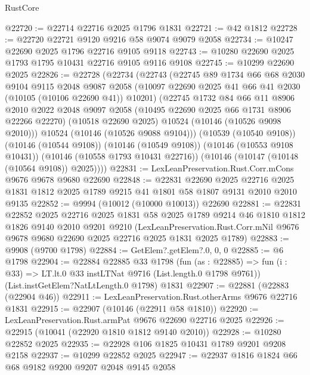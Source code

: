 \begin{lexlean}{RustCore}
\begin{coremodule}
@22720 := @22714 @22716 @2025 @1796 @1831
@22721 := @42 @1812
@22728 := @22720 @22721 @9120 @9216 @58 @9074 @9079 @2058
@22734 := @10247 @22690 @2025 @1796 @22716 @9105 @9118
@22743 := @10280 @22690 @2025 @1793 @1795 @10431 @22716 @9105 @9116 @9108
@22745 := @10299 @22690 @2025
@22826 := @22728
    (@22734
      (@22743
        (@22745
          @89
          @1734
          @66
          @68
          @2030
          @9104
          @9115
          @2048
          @9087
          @2058
          (@10097 @22690 @2025 @41 @66 @41 @2030 (@10105 (@10106 @22690 @41)) @10201)
          (@22745
            @1732
            @84
            @66
            @11
            @8906
            @2010
            @2022
            @2048
            @9097
            @2058
            (@10495 @22690 @2025 @66 @1731 @8906 @22266 @22270)
            (@10518 @22690 @2025)
            @10524
            (@10146 (@10526 @9098 @2010)))
          @10524
          (@10146 (@10526 @9088 @9104)))
        (@10539 (@10540 @9108))
        (@10146 (@10544 @9108))
        (@10146 (@10549 @9108))
        (@10146 (@10553 @9108 @10431))
        (@10146 (@10558 @1793 @10431 @22716))
        (@10146 (@10147 (@10148 (@10564 @9108)) @2025))))
@22831 := LexLeanPreservation.Rust.Corr.mCons @9676 @9678 @9680 @22690
@22848 := @22831
    @22690
    @2025
    @22716
    @2025
    @1831
    @1812
    @2025
    @1789
    @9215
    @41
    @1801
    @58
    @1807
    @9131
    @2010
    @2010
    @9135
@22852 := @9994 (@10012 (@10000 @10013)) @22690
@22881 := @22831
    @22852
    @2025
    @22716
    @2025
    @1831
    @58
    @2025
    @1789
    @9214
    @46
    @1810
    @1812
    @1826
    @9140
    @2010
    @9201
    @9210
    (LexLeanPreservation.Rust.Corr.mNil
      @9676
      @9678
      @9680
      @22690
      @2025
      @22716
      @2025
      @1831
      @2025
      @1789)
@22883 := @9908 (@9700 @1798)
@22884 := GetElem?.getElem?.{0, 0, 0}
@22885 := @6 @1798
@22904 := @22884
    @22885
    @33
    @1798
    (fun (as : @22885) =>
    fun (i : @33) => LT.lt.{0} @33 instLTNat @9716 (List.length.{0} @1798 @9761))
    (List.instGetElem?NatLtLength.{0} @1798)
    @1831
@22907 := @22881 (@22883 (@22904 @46))
@22911 := LexLeanPreservation.Rust.otherArms @9676 @22716 @1831
@22915 := @22907 (@10146 (@22911 @58 @1810))
@22920 := LexLeanPreservation.Rust.armPat @9676 @22690 @22716 @2025
@22926 := @22915 (@10041 (@22920 @1810 @1812 @9140 @2010))
@22928 := @10280 @22852 @2025
@22935 := @22928 @106 @1825 @10431 @1789 @9201 @9208 @2158
@22937 := @10299 @22852 @2025
@22947 := @22937 @1816 @1824 @66 @68 @9182 @9200 @9207 @2048 @9145 @2058

\end{coremodule}
\end{lexlean}
